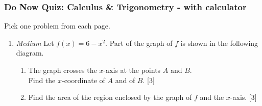 \documentclass[12pt, twoside]{article}
\begin{document}
\subsubsection*{Do Now Quiz: Calculus \& Trigonometry - with calculator}
Pick one problem from each page.
 \begin{enumerate}



\item \emph{Medium} Let $f(x)=6-x^2$. Part of the graph of $f$ is shown in the following diagram.
    \begin{center}
    \end{center}
  \begin{enumerate}
    \item The graph crosses the $x$-axis at the points $A$ and $B$.\\
    Find the $x$-coordinate of $A$ and of $B$. \hfill [3]
    \item Find the area of the region enclosed by the graph of $f$ and the $x$-axis.  \hfill [3]
  \end{enumerate}


\end{enumerate}
\end{document}

